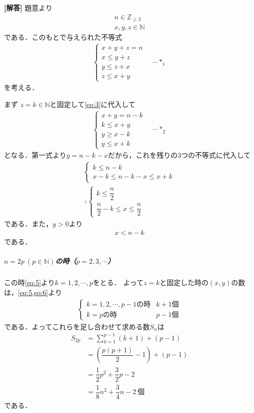 \documentclass[../../main.tex]{subfiles}
\begin{document}
\begin{oframed}
  
\end{oframed}

{\bf [解答]}
題意より
\begin{align}
  n\in\mathbb{Z}_{\ge3} \label{eq:1}\\
  x,y,z\in\mathbb{N} \label{eq:2}
\end{align}
である．このもとで与えられた不等式
\begin{align}
  \begin{cases}\displaystyle
    x+y+z=n \\
    x\le y+z \\
    y\le z+x \\
    z\le x+y
  \end{cases}
  \quad\cdots *_1 \label{eq:3}
\end{align}
を考える．

まず $z=k\in\mathbb{N}$と固定して\cref{eq:3}に代入して
\begin{align}
  \begin{cases}\displaystyle
    x+y=n-k \\
    k\le x+y \\
    y\ge x-k \\
    y\le x+k
  \end{cases}
  \quad\cdots *_2 \label{eq:4}
\end{align}
となる．第一式より$y=n-k-x$だから，これを残りの3つの不等式に代入して
\begin{align}
  \begin{cases}
    k \le n-k \\
    x-k\le n-k-x\le x+k
  \end{cases} \\
  \therefore
  \begin{cases}
    k \le \dfrac{n}{2} \\
    \dfrac{n}{2}-k\le x\le\dfrac{n}{2}
  \end{cases} \label{eq:5}
\end{align}
である．また，$y>0$より
\begin{align}
  x < n-k \label{eq:6}
\end{align}
である．

\subparagraph{$n=2p\ (p\in\mathbb{N})$の時（$p=2,3,\cdots$）}

この時\cref{eq:5}より$k=1,2,\cdots, p$をとる．
よって$z=k$と固定した時の$(x,y)$の数は，\cref{eq:5,eq:6}より
\begin{align}
  \begin{cases}\displaystyle
    k=1,2,\cdots,p-1\text{の時} & k+1\text{個} \\
    k=p\text{の時} & p-1\text{個}
  \end{cases}
\end{align}
である．よってこれらを足し合わせて求める数$S_n$は
\begin{align}
  S_{2p}
  &=\sum_{k=1}^{p-1}(k+1)+(p-1) \\
  &=\left(\dfrac{p(p+1)}{2}-1\right)+(p-1) \\
  &=\dfrac{1}{2}p^2+\dfrac{3}{2}p-2 \\
  &=\dfrac{1}{8}n^2+\dfrac{3}{4}n-2\ \text{個}
\end{align}
である．
\end{document}
